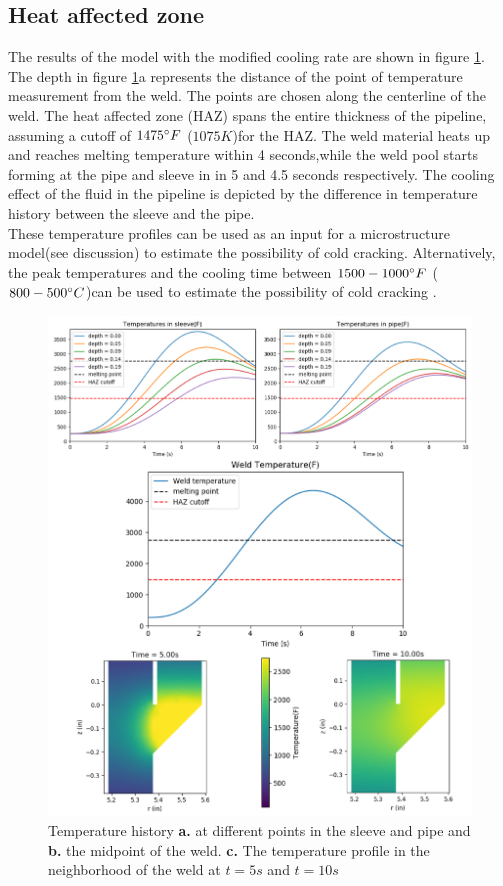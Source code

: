 \documentclass{article}
\makeatletter
\newcommand{\autocitel}[1]{\autocite{#1}\checknextarg}
\newcommand{\checknextarg}{\@ifnextchar\bgroup{\gobblenextarg}{}}
\newcommand{\gobblenextarg}[1]{$^,$\autocite{#1}\@ifnextchar\bgroup{\gobblenextarg}{}}
\makeatother
\begin{document}
\subsection{Heat affected zone}
	The results of the model with the modified cooling rate are shown in figure \ref{fig3}. The depth in figure \ref{fig3}a represents the distance of the point of temperature measurement from the weld. The points are chosen along the centerline of the weld. The heat affected zone (HAZ) spans the entire thickness of the pipeline, assuming a cutoff of $1475 \degree F$ ($1075 K$)\autocitel{cheng2004weld}for the HAZ. The weld material heats up and reaches melting temperature within 4 seconds,while the weld pool starts forming at the pipe  and sleeve in in 5 and 4.5 seconds respectively. The cooling effect of the fluid in the pipeline is depicted by the difference in temperature history between the sleeve and the pipe. \\ 
	These temperature profiles can be used as an input for a microstructure model(see discussion) to estimate the possibility of cold cracking. Alternatively, the peak temperatures and the cooling time between $1500-1000 \degree F$ ($800-500 \degree C$)can be used to estimate the possibility of cold cracking \autocitel{lobanov2013formation}. 

\begin{figure}[h]
	\centering
	\includegraphics[width=12 cm]{linear_results.png}
	\caption{ Temperature history \textbf{a.} at different points in the sleeve and pipe and \textbf{b.} the midpoint of the weld. \textbf{c.} The temperature profile in the neighborhood of the weld at $t = 5s$ and $t = 10s$ }
	\label{fig3}
\end{figure}
\end{document}
